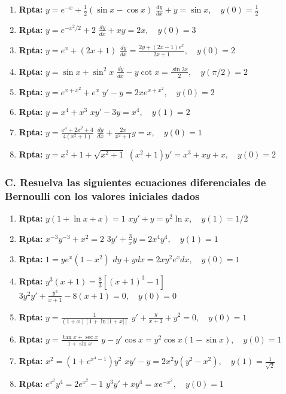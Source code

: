 \documentclass[a4paper,12pt]{article}
\begin{document}
\begin{enumerate}
    \item \textbf{Rpta:} \(y = e^{-x} + \frac{1}{2}(\sin x - \cos x)\) \hfill \(\frac{dy}{dx} + y = \sin x, \quad y(0)= \frac{1}{2}\)
    \item \textbf{Rpta:} \(y = e^{-x^2/2} + 2\) \hfill \(\frac{dy}{dx} + xy = 2x, \quad y(0)=3\)
    \item \textbf{Rpta:} \(y = e^x + (2x+1)\) \hfill \(\frac{dy}{dx} = \frac{2y + (2x-1)e^x}{2x+1}, \quad y(0)=2\)
    \item \textbf{Rpta:} \(y = \sin x + \sin^2 x\) \hfill \(\frac{dy}{dx} - y\cot x = \frac{\sin 2x}{2}, \quad y(\pi/2)=2\)
    \item \textbf{Rpta:} \(y = e^{x+x^2} + e^x\) \hfill \(y' - y = 2x e^{x+x^2}, \quad y(0)=2\)
    \item \textbf{Rpta:} \(y = x^4 + x^3\) \hfill \(x y' - 3y = x^4, \quad y(1)=2\)
    \item \textbf{Rpta:} \(y = \frac{x^4+2x^2+4}{4(x^2+1)}\) \hfill \(\frac{dy}{dx} + \frac{2x}{x^2+1}y = x, \quad y(0)=1\)
    \item \textbf{Rpta:} \(y = x^2+1 + \sqrt{x^2+1}\) \hfill \((x^2+1)y' = x^3 + xy + x, \quad y(0)=2\)
\end{enumerate}

\subsubsection*{C. Resuelva las siguientes ecuaciones diferenciales de Bernoulli con los valores iniciales dados}

\begin{enumerate}
    \item \textbf{Rpta:} \(y(1 + \ln x + x) = 1\) \hfill \(x y' + y = y^2 \ln x, \quad y(1)=1/2\)
    \item \textbf{Rpta:} \(x^{-3}y^{-3} + x^2 = 2\) \hfill \(3 y' + \frac{3}{x}y = 2x^4 y^4, \quad y(1)=1\)
    \item \textbf{Rpta:} \(1 = y e^x (1 - x^2)\) \hfill \(dy + y dx = 2xy^2 e^x dx, \quad y(0)=1\)
    \item \textbf{Rpta:} \(y^3(x+1) = \frac{8}{3}\left[(x+1)^3-1\right]\) \hfill \(3y^2 y' + \frac{y^3}{x+1} - 8(x+1) = 0, \quad y(0)=0\)
    \item \textbf{Rpta:} \(y = \frac{1}{(1+x)\left[1 + \ln|1+x|\right]}\) \hfill \(y' + \frac{y}{x+1} + y^2 = 0, \quad y(0)=1\)
    \item \textbf{Rpta:} \(y = \frac{\tan x + \sec x}{1 + \sin x}\) \hfill \(y - y'\cos x = y^2 \cos x(1-\sin x), \quad y(0)=1\)
    \item \textbf{Rpta:} \(x^2 = \left(1 + e^{x^4-1}\right) y^2\) \hfill \(x y' - y = 2x^2 y(y^2 - x^2), \quad y(1)=\frac{1}{\sqrt{2}}\)
    \item \textbf{Rpta:} \(e^{x^2} y^4 = 2e^{x^2} - 1\) \hfill \(y^3 y' + x y^4 = x e^{-x^2}, \quad y(0)=1\)
\end{enumerate}
\end{document}
